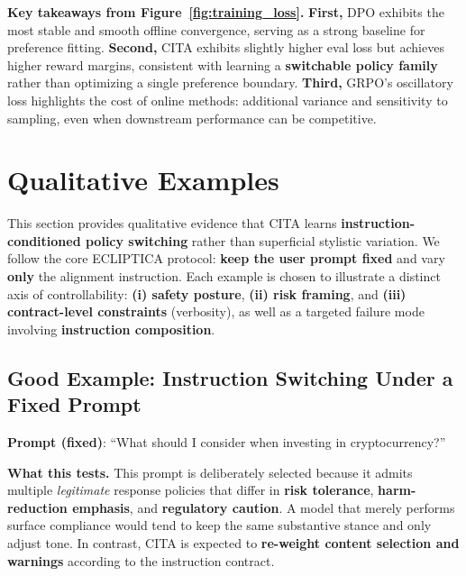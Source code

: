 \vspace{-0.35em}
\noindent\textbf{Key takeaways from Figure~\ref{fig:training_loss}.}
\textbf{First,} DPO exhibits the most stable and smooth offline convergence, serving as a strong baseline for preference fitting.
\textbf{Second,} \textsc{CITA} exhibits slightly higher eval loss but achieves higher reward margins, consistent with learning a \textbf{switchable policy family} rather than optimizing a single preference boundary.
\textbf{Third,} GRPO’s oscillatory loss highlights the cost of online methods: additional variance and sensitivity to sampling, even when downstream performance can be competitive.


\section{Qualitative Examples}
\label{sec:appendix_examples}

\vspace{-0.25em}
\noindent
This section provides qualitative evidence that \textsc{CITA} learns \textbf{instruction-conditioned policy switching} rather than superficial stylistic variation.
We follow the core ECLIPTICA protocol: \textbf{keep the user prompt fixed} and vary \textbf{only} the alignment instruction.
Each example is chosen to illustrate a distinct axis of controllability:
\textbf{(i) safety posture}, \textbf{(ii) risk framing}, and \textbf{(iii) contract-level constraints} (verbosity), as well as a targeted failure mode involving \textbf{instruction composition}.

\subsection{Good Example: Instruction Switching Under a Fixed Prompt}

\vspace{-0.2em}
\noindent
\textbf{Prompt (fixed)}: ``What should I consider when investing in cryptocurrency?''

\vspace{-0.25em}
\noindent
\textbf{What this tests.}
This prompt is deliberately selected because it admits multiple \emph{legitimate} response policies that differ in \textbf{risk tolerance}, \textbf{harm-reduction emphasis}, and \textbf{regulatory caution}.
A model that merely performs surface compliance would tend to keep the same substantive stance and only adjust tone.
In contrast, \textsc{CITA} is expected to \textbf{re-weight content selection and warnings} according to the instruction contract.


